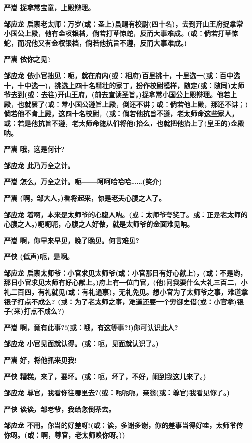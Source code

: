 \textbf{严嵩 捉拿常宝童，上殿辩理。}

\textbf{邹应龙
启禀老太师：万岁(或：圣上)虽赐有校尉(四十名)，去到开山王府捉拿常小国公上殿，他有金杈银档，倘若打草惊蛇，反而大事难成。(或：倘若打草惊蛇，而况他又有金杈银档，倘若他抗旨不遵，反而大事难成。)}

\textbf{严嵩 依你之见?}

\textbf{邹应龙
依小官拙见：呃，就在府内(或：相府)百里挑十，十里选一(或：百中选十，十中选一)，挑选上四十名精壮的家丁，扮作校尉模样，随定(或：随同)太师爷去到(或：去往)开山王府，(前去宣读圣旨，)捉拿常小国公上殿辩理。他若上殿，也就罢了(或：常小国公遵旨上殿，倒还不讲；或：倘若他上殿，那还不讲；)倘若他不肯上殿，这四十名校尉，(或：倘若他抗旨不遵，老太师命这些家人，或：若是他抗旨不遵，老太师命随从们将他)抬么，也就把他抬上了(皇王的)金殿呐。}

\textbf{严嵩 哦，这是何计?}

\textbf{邹应龙 此乃万全之计。}

\textbf{严嵩 怎么，万全之计。呃------呵呵哈哈哈\ldots{}\ldots{}(笑介)}

\textbf{严嵩 (啊，邹大人，)看将起来，你是老夫心腹之人了。}

\textbf{邹应龙
着啊，本来是太师爷的心腹人呐。(或：太师爷夸奖了。或：正是老太师的心腹之人。)呃呃呃，心腹之人好做，就是太师爷的金面难见呐。}

\textbf{严嵩 啊，你早来早见，晚了晚见。何言难见?}

\textbf{严侠 (低声)呃，是啊。}

\textbf{邹应龙
启禀太师爷：小官求见太师爷(或：小官那日有好心献上)，(或：不是哟，那日小官求见太师有好心献上。)府上有一位门官，(他)问我要什么大礼三百二，小礼二百四，有礼就见(或：有礼通禀)，无礼免见。想小官为了太师爷之事，难道拿银子打点不成么?
(或：为了老太师之事，难道还要一个穷御史借(或：小官拿)银子(来)打点不成么?)}

\textbf{严嵩 啊，竟有此事?!(或：哦，有这等事?!)你可认识此人?}

\textbf{邹应龙 小官见面就认得。(或：呃，见面就认识了。)}

\textbf{严嵩 好，将他抓来见我!}

\textbf{严侠 糟糕，来了，要坏。(或：呃，坏了，不好，闹到我这儿来了。)}

\textbf{邹应龙
尊官，我看你往哪里去?(或：呃呃呃，亲翁(或：尊官)我看见你了。)}

\textbf{严侠 诶诶，邹老爷，我给您倒茶去。}

\textbf{邹应龙
不用。你当的好差呀!(或：诶，多谢多谢，你的差事当得好哇，太师爷传你呀。(或：啊，尊官，老太师唤你呀。))}

